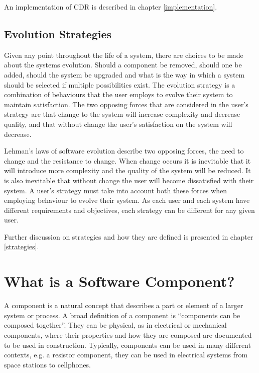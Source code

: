 An implementation of CDR is described in chapter \ref{implementation}.

\subsection{Evolution Strategies}
Given any point throughout the life of a system, there are choices to be made about the systems evolution.
Should a component be removed, should one be added, should the system be upgraded and what is the way in which a system should be selected if multiple possibilities exist.
The evolution strategy is a combination of behaviours that the user employs to evolve their system to maintain satisfaction.
The two opposing forces that are considered in the user's strategy are that change to the system will increase complexity and decrease quality, 
and that without change the user's satisfaction on the system will decrease.

Lehman's laws of software evolution \citep{lehman1980,lehman1997} describe two opposing forces,
the need to change and the resistance to change.
When change occurs it is inevitable that it will introduce more complexity and the quality of the system will be reduced.
It is also inevitable that without change the user will become dissatisfied with their system.
A user's strategy must take into account both these forces when employing behaviour to evolve their system.
As each user and each system have different requirements and objectives, each strategy can be different for any given user.

Further discussion on strategies and how they are defined is presented in chapter \ref{strategies}.

\section{What is a Software Component?}
\label{background.components}
A component is a natural concept that describes a part or element of a larger system or process.
A broad definition of a component is ``components can be composed together''.
They can be physical, as in electrical or mechanical components, where their properties and how they are composed are documented to be used in construction.
Typically, components can be used in many different contexts, e.g. a resistor component, they can be used in electrical systems from space stations to cellphones.   

